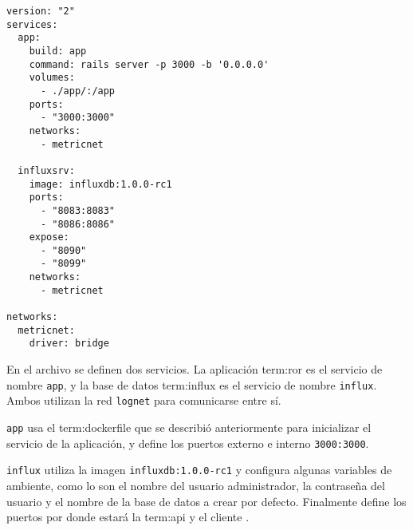 \begin{lstlisting}
version: "2"
services:
  app:
    build: app
    command: rails server -p 3000 -b '0.0.0.0'
    volumes:
      - ./app/:/app
    ports:
      - "3000:3000"
    networks:
      - metricnet

  influxsrv:
    image: influxdb:1.0.0-rc1
    ports:
      - "8083:8083"
      - "8086:8086"
    expose:
      - "8090"
      - "8099"
    networks:
      - metricnet

networks:
  metricnet:
    driver: bridge
\end{lstlisting}

En el archivo se definen dos servicios. La aplicación \gls{term:ror} es el
servicio de nombre \lstinline{app}, y la base de datos \gls{term:influx} es el
servicio de nombre \lstinline{influx}. Ambos utilizan la red \lstinline{lognet}
para comunicarse entre sí.

\lstinline{app} usa el \gls{term:dockerfile} que se describió anteriormente para
inicializar el servicio de la aplicación, y define los puertos externo e interno
\lstinline{3000:3000}.

\lstinline{influx} utiliza la imagen \lstinline{influxdb:1.0.0-rc1} y configura
algunas variables de ambiente, como lo son el nombre del usuario administrador,
la contraseña del usuario y el nombre de la base de datos a crear por defecto.
Finalmente define los puertos por donde estará la \gls{term:api} y el cliente
.
